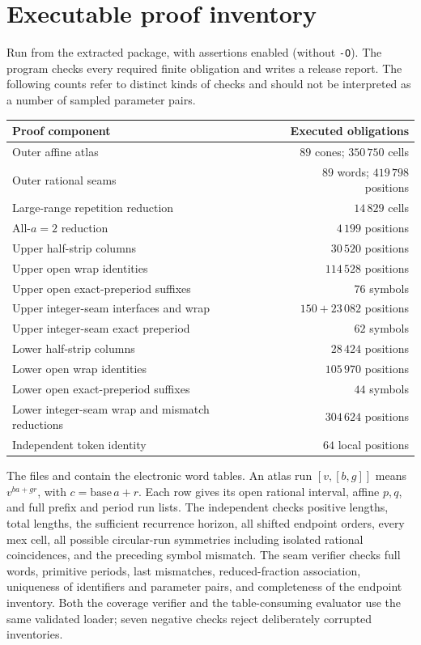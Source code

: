 \documentclass[11pt]{article}
\theoremstyle{remark}\newtheorem{remark}[theorem]{Remark}
\begin{document}
\section{Executable proof inventory}\label{app:uniform}
Run  from the extracted package, with
assertions enabled (without \texttt{-O}). The program checks every required
finite obligation and writes a release report. The following counts refer
to distinct kinds of checks and should not be interpreted as a number of
sampled parameter pairs.
\begin{center}\small
\begin{tabular}{p{}r}\toprule
Proof component & Executed obligations\\\midrule
Outer affine atlas & $89$ cones; $350\,750$ cells\\
Outer rational seams & $89$ words; $419\,798$ positions\\
Large-range repetition reduction & $14\,829$ cells\\
All-$a=2$ reduction & $4\,199$ positions\\
Upper half-strip columns & $30\,520$ positions\\
Upper open wrap identities & $114\,528$ positions\\
Upper open exact-preperiod suffixes & $76$ symbols\\
Upper integer-seam interfaces and wrap & $150+23\,082$ positions\\
Upper integer-seam exact preperiod & $62$ symbols\\
Lower half-strip columns & $28\,424$ positions\\
Lower open wrap identities & $105\,970$ positions\\
Lower open exact-preperiod suffixes & $44$ symbols\\
Lower integer-seam wrap and mismatch reductions & $304\,624$ positions\\
Independent token identity & $64$ local positions\\\bottomrule
\end{tabular}
\end{center}

The files  and
 contain the electronic word tables.
An atlas run $[v,[b,g]]$ means $v^{ba+gr}$, with $c=\mathrm{base}\,a+r$.
Each row gives its open rational interval, affine $p,q$, and full prefix
and period run lists. The independent  checks
positive lengths, total lengths, the sufficient recurrence horizon, all
shifted endpoint orders, every mex cell, all possible circular-run
symmetries including isolated rational coincidences, and the preceding
symbol mismatch. The seam verifier checks full words, primitive periods,
last mismatches, reduced-fraction association, uniqueness of identifiers
and parameter pairs, and completeness of the endpoint inventory. Both the
coverage verifier and the table-consuming evaluator use the same validated
loader; seven negative checks reject deliberately corrupted inventories.
\end{document}
